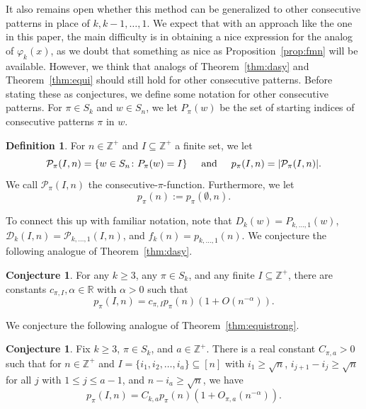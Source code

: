 \documentclass{amsart}
\theoremstyle{definition}
\newtheorem{definition}[theorem]{Definition}
\newtheorem{conjecture}[theorem]{Conjecture}
\begin{document}
It also remains open whether this method can be generalized to other consecutive patterns in place of $k, k-1, \ldots, 1$. We expect that with an approach like the one in this paper, the main difficulty is in obtaining a nice expression for the analog of $\varphi_k(x)$, as we doubt that something as nice as Proposition~\ref{prop:fmn} will be available. However, we think that analogs of Theorem~\ref{thm:dasy} and Theorem~\ref{thm:equi} should still hold for other consecutive patterns. Before stating these as conjectures, we define some notation for other consecutive patterns. For $\pi\in S_k$ and $w\in S_n$, we let $P_\pi(w)$ be the set of starting indices of consecutive patterns $\pi$ in $w$. 

\begin{definition}
For $n\in \mathbb{Z}^+$ and $I\subseteq \mathbb{Z}^+$ a finite set, we let
\[\mathcal{P}_{\pi}(I,n)=\{w\in S_n\colon P_\pi(w)=I\}\hspace{5mm}\text{and}\hspace{5mm} p_\pi(I,n)=|\mathcal{P}_\pi(I,n)|.\]
We call $\mathcal{P}_\pi(I,n)$ the consecutive-$\pi$-function. Furthermore, we let
\[p_\pi(n):=p_{\pi}(\emptyset,n).\]
\end{definition}

To connect this up with familiar notation, note that $D_k(w)=P_{k,\ldots,1}(w)$, $\mathcal{D}_k(I,n)=\mathcal{P}_{k,\ldots,1}(I,n)$, and $f_k(n)=p_{k,\ldots,1}(n)$. We conjecture the following analogue of Theorem~\ref{thm:dasy}.

\begin{conjecture}
For any $k\geq 3$, any $\pi\in S_k$, and any finite $I\subseteq \mathbb{Z}^+$, there are constants $c_{\pi,I},\alpha\in \mathbb{R}$ with $\alpha>0$ such that 
\[p_{\pi}(I,n)=c_{\pi,I}p_\pi(n)\left(1+O\left(n^{-\alpha}\right)\right).\]
\end{conjecture}

We conjecture the following analogue of Theorem~\ref{thm:equistrong}.

\begin{conjecture}
Fix $k\geq 3$, $\pi\in S_k$, and $a\in \mathbb{Z}^+$. There is a real constant $C_{\pi,a}>0$ such that for $n\in \mathbb{Z}^+$ and $I=\{i_1,i_2,\ldots, i_a\}\subseteq [n]$ with $i_1\geq \sqrt{n}$, $i_{j+1}-i_j\geq \sqrt{n}$ for all $j$ with $1\leq j\leq a-1$, and $n-i_a\geq \sqrt{n}$, we have
\[p_\pi(I,n)=C_{k,a} p_\pi(n)\left(1+O_{\pi,a}\left(n^{-\alpha}\right)\right).\]
\end{conjecture}
\end{document}
